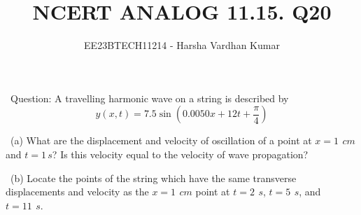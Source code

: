 \documentclass[journal,12pt,twocolumn]{IEEEtran}
\title{NCERT ANALOG 11.15. Q20}
\author{EE23BTECH11214 - Harsha Vardhan Kumar}
\begin{document}
\maketitle
\ Question:
A travelling harmonic wave on a string is described by
$$ y(x,t) = 7.5 \sin(0.0050x + 12t + \frac{\pi}{4}) $$

\ (a) What are the displacement and velocity of oscillation of a point at $x = 1\,\ cm $ and $t = 1\,s $? Is this velocity equal to the velocity of wave propagation?

\ (b) Locate the points of the string which have the same transverse displacements and velocity as the $x = 1\,\ cm $ point at $t = 2 \,\ s $, $t = 5 \,\ s $, and $t = 11 \,\ s $.
\end{document}
